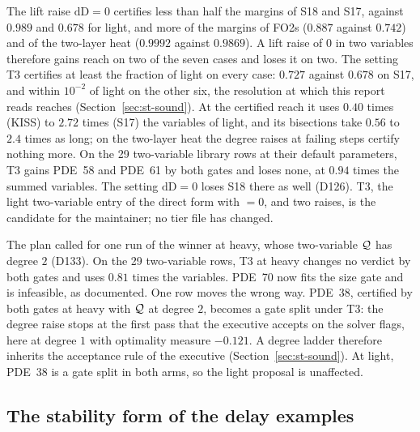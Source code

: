 The lift raise $\mathrm{dD}=0$ certifies less than half the margins of S18 and S17, against $0.989$ and $0.678$ for light, and more of the margins of FO2s ($0.887$ against $0.742$) and of the two-layer heat ($0.9992$ against $0.9869$). A lift raise of $0$ in two variables therefore gains reach on two of the seven cases and loses it on two. The setting T3 certifies at least the fraction of light on every case: $0.727$ against $0.678$ on S17, and within $10^{-2}$ of light on the other six, the resolution at which this report reads reaches (Section~\ref{sec:st-sound}). At the certified reach it uses $0.40$ times (KISS) to $2.72$ times (S17) the variables of light, and its bisections take $0.56$ to $2.4$ times as long; on the two-layer heat the degree raises at failing steps certify nothing more. On the 29 two-variable library rows at their default parameters, T3 gains PDE~58 and PDE~61 by both gates and loses none, at $0.94$ times the summed variables. The setting $\mathrm{dD}=0$ loses S18 there as well (D126). T3, the light two-variable entry of the direct form with  $=0$,   and two raises, is the candidate for the maintainer; no tier file has changed.

The plan called for one run of the winner at heavy, whose two-variable $\mathcal{Q}$ has degree $2$ (D133). On the 29 two-variable rows, T3 at heavy changes no verdict by both gates and uses $0.81$ times the variables. PDE~70 now fits the size gate and is infeasible, as documented. One row moves the wrong way. PDE~38, certified by both gates at heavy with $\mathcal{Q}$ at degree $2$, becomes a gate split under T3: the degree raise stops at the first pass that the executive accepts on the solver flags, here at degree $1$ with optimality measure $-0.121$. A degree ladder therefore inherits the acceptance rule of the executive (Section~\ref{sec:st-sound}). At light, PDE~38 is a gate split in both arms, so the light proposal is unaffected.

\subsection{The stability form of the delay examples}\label{sec:st-form}

